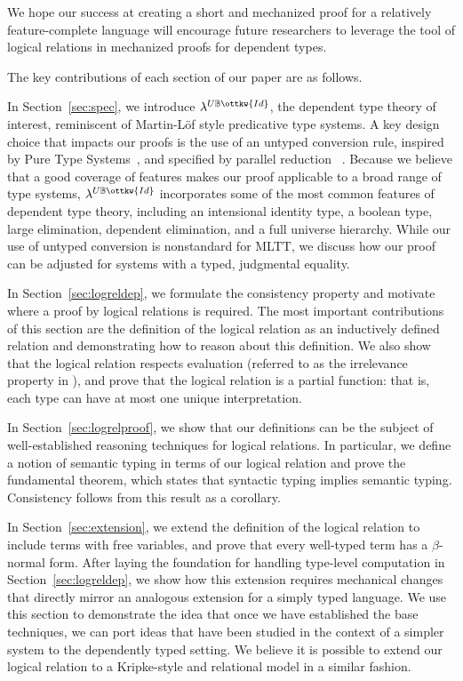 \documentclass[acmsmall,screen=true,
\ifpublic review=false\else,review=true\fi
  ,anonymous=\ifanonymous true\else false\fi]{acmart}
\newcommand{\lang}{$\lambda^{U\mathbb{B}\ottkw{Id}}$\xspace}
\newcommand{\scw}[1]{}
\newcommand{\yl}[1]{}
\begin{document}
We hope our success at creating a short and mechanized proof for a
relatively feature-complete language will encourage future researchers
to leverage the tool of logical relations in mechanized
proofs for dependent types.

\yl{new overview ends here}

The key contributions of each section of our paper are as follows.
\scw{I'm still not happy with this overview / contributions list. }



In Section~\ref{sec:spec}, we introduce \lang{}, the dependent type theory of
interest, reminiscent of Martin-Löf style predicative type systems. A key
design choice that impacts our proofs is the use of an untyped conversion
rule, inspired by Pure Type Systems~\citep{barendregt1991introduction}, and
specified by parallel
reduction~\citep{takahashi-parallel-reduction, barendregt:lambda-calculi-with-types} %
.
Because we believe that a good coverage of features makes our proof applicable
to a broad range of type systems, \lang{} incorporates some of the most common
features of dependent type theory, including an intensional identity type, a
boolean type, large elimination, dependent elimination, and a full universe
hierarchy. While our use of untyped conversion is nonstandard for MLTT, we
discuss how our proof can be adjusted for systems with a typed, judgmental
equality.

In Section~\ref{sec:logreldep}, we formulate the consistency property and
motivate where a proof by logical relations is required. The most important
contributions of this section are the definition of the logical relation as an
inductively defined relation and demonstrating how to reason about this
definition. We also show that the logical relation respects evaluation
(referred to as the irrelevance property in \citet{martin-lof-a-la-coq}), and
prove that the logical relation is a partial function: that is, each type can
have at most one unique interpretation.

In Section~\ref{sec:logrelproof}, we show that our definitions can be the
subject of well-established reasoning techniques for logical relations. In
particular, we define a notion of semantic typing in terms of our logical
relation and prove the fundamental theorem, which states that syntactic typing
implies semantic typing. Consistency follows from this result as a corollary.

In Section~\ref{sec:extension}, we extend the definition of the logical relation
to include terms with free variables, and prove that every well-typed term
has a $\beta$-normal form. After laying the foundation for handling type-level
computation in Section~\ref{sec:logreldep}, we show how this extension requires mechanical
changes that directly mirror an analogous extension for a simply typed
language. We use this section to demonstrate the idea that once we have
established the base techniques, we can port ideas that have been studied in
the context of a simpler system to the dependently typed setting.  We believe
it is possible to extend our logical relation to a Kripke-style and relational
model in a similar fashion.
\end{document}
